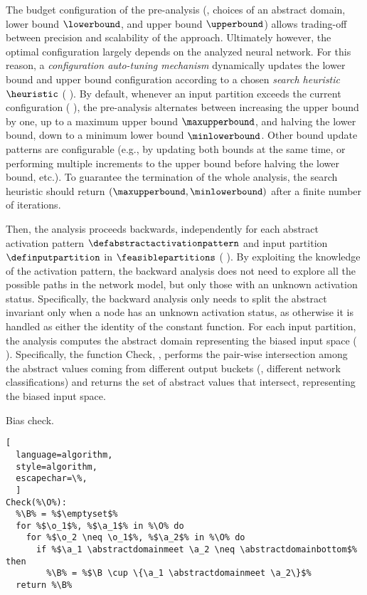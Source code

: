 {The budget configuration of the pre-analysis (\ie, choices of an abstract domain, lower bound $\lowerbound$, and upper bound $\upperbound$) allows trading-off between precision and scalability of the approach. Ultimately however, the optimal configuration largely depends on the analyzed neural network. For this reason, a \emph{configuration auto-tuning mechanism} dynamically updates the lower bound and upper bound configuration according to a chosen \emph{search heuristic} $\heuristic$ (\cf{} ). By default, whenever an input partition exceeds the current configuration (\cf{} ), the pre-analysis alternates between increasing the upper bound by one, up to a maximum upper bound $\maxupperbound$, and halving the lower bound, down to a minimum lower bound $\minlowerbound$. Other bound update patterns are configurable (e.g., by updating both bounds at the same time, or performing multiple increments to the upper bound before halving the lower bound, etc.). To guarantee the termination of the whole analysis, the search heuristic should return $(\maxupperbound, \minlowerbound)$ after a finite number of iterations.


Then, the analysis proceeds backwards, independently for each abstract
activation pattern $\defabstractactivationpattern$ and input partition
$\definputpartition$ in $\feasiblepartitions$ (\cf{} ). By
exploiting the knowledge of the activation pattern, the backward analysis does
not need to explore all the possible paths in the network model, but only those
with an unknown activation status. Specifically, the backward analysis only
needs to split the abstract invariant only when a node has an unknown activation
status, as otherwise it is handled as either the identity of the constant
function. For each input partition, the analysis computes the abstract domain
representing the biased input space (\cf{} ). Specifically, the
function \textup{Check}, \cf{} , performs the pair-wise
intersection among the abstract values coming from different output buckets
(\ie, different network classifications) and returns the set of abstract values
that intersect, representing the biased input space.

\begin{marginalgorithm}
  \caption{Bias check.}
\begin{lstlisting}[
  language=algorithm,
  style=algorithm,
  escapechar=\%,
  ]
Check(%\O%):
  %\B% = %$\emptyset$%
  for %$\o_1$%, %$\a_1$% in %\O% do
    for %$\o_2 \neq \o_1$%, %$\a_2$% in %\O% do
      if %$\a_1 \abstractdomainmeet \a_2 \neq \abstractdomainbottom$% then
        %\B% = %$\B \cup \{\a_1 \abstractdomainmeet \a_2\}$%
  return %\B%
\end{lstlisting}
\end{marginalgorithm}

}
